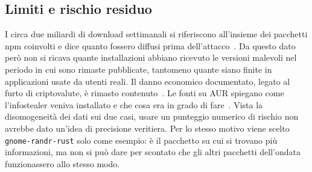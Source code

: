 \subsection{Limiti e rischio residuo}
I circa due miliardi di download settimanali si riferiscono all'insieme dei pacchetti npm coinvolti e dice quanto fossero diffusi prima dell'attacco~\cite{debug2025}. 
Da questo dato però non si ricava quante installazioni abbiano ricevuto le versioni malevoli nel periodo in cui sono rimaste pubblicate, tantomeno quante siano finite in applicazioni usate da utenti reali. Il danno economico documentato, legato al furto di criptovalute, è rimasto contenuto~\cite{cso2025}. 
Le fonti su AUR spiegano come l'infostealer veniva installato e che cosa era in grado di fare~\cite{arch-aur-incident-2026,ioctl2026}. 
Vista la disomogeneità dei dati sui due casi, usare un punteggio numerico di rischio non avrebbe dato un'idea di precisione veritiera. 
Per lo stesso motivo viene scelto \texttt{gnome-randr-rust} solo come esempio: è il pacchetto su cui si trovano più informazioni, ma non si può dare per scontato che gli altri pacchetti dell'ondata funzionassero allo stesso modo.